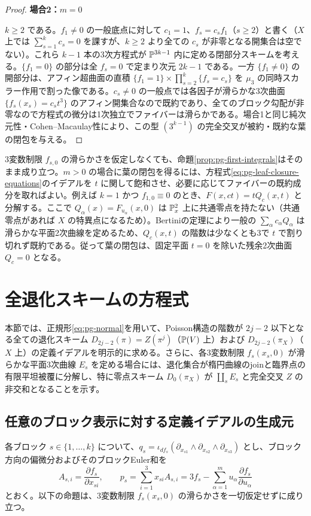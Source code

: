 \begin{proof}
\par\medskip\noindent\textbf{場合2：$m=0$}\par\nobreak\smallskip
$k\ge2$ である。$f_1\ne0$ の一般底点に対して $c_1=1$、$f_s=c_s f_1$（$s\ge2$）と書く（$X$ 上では $\sum_{s=1}^k c_s=0$ を課すが、$k\ge2$ より全ての $c_s$ が非零となる開集合は空でない）。これら $k-1$ 本の3次方程式が $\mathbb P^{3k-1}$ 内に定める閉部分スキームを考える。$\{f_1=0\}$ の部分は全 $f_s=0$ で定まり次元 $2k-1$ である。一方 $\{f_1\ne0\}$ の開部分は、アフィン超曲面の直積 $\{f_1=1\}\times\prod_{s=2}^k\{f_s=c_s\}$ を $\mu_3$ の同時スカラー作用で割った像である。$c_s\ne0$ の一般点では各因子が滑らかな3次曲面 $\{f_s(x_s)=c_s t^3\}$ のアフィン開集合なので既約であり、全てのブロック勾配が非零なので方程式の微分は1次独立でファイバーは滑らかである。場合1と同じ純次元性・Cohen--Macaulay性により、この型 $(3^{k-1})$ の完全交叉が被約・既約な葉の閉包を与える。
\end{proof}

\begin{remark}\label{rem:pg-zero-restriction-leaf}
3変数制限 $f_{s,0}$ の滑らかさを仮定しなくても、命題\ref{prop:pg-first-integrals}はそのまま成り立つ。$m>0$ の場合に葉の閉包を得るには、方程式\eqref{eq:pg-leaf-closure-equations}のイデアルを $t$ に関して飽和させ、必要に応じてファイバーの既約成分を取ればよい。例えば $k=1$ かつ $f_{1,0}\equiv0$ のとき、$F(x,ct)=tQ_c(x,t)$ と分解する。ここで $Q_\alpha(x)=F_{u_\alpha}(x,0)$ は $\mathbb P_x^2$ 上に共通零点を持たない（共通零点があれば $X$ の特異点になるため）。Bertiniの定理により一般の $\sum_\alpha c_\alpha Q_\alpha$ は滑らかな平面2次曲線を定めるため、$Q_c(x,t)$ の階数は少なくとも3で $t$ で割り切れず既約である。従って葉の閉包は、固定平面 $t=0$ を除いた残余2次曲面 $Q_c=0$ となる。
\end{remark}


\section{全退化スキームの方程式}\label{sec:pg-degeneracy}

本節では、正規形\eqref{eq:pg-normal}を用いて、Poisson構造の階数が $2j-2$ 以下となる全ての退化スキーム $D_{2j-2}(\pi)=Z(\pi^j)$（$\mathbb P(V)$ 上）および $D_{2j-2}(\pi_X)$（$X$ 上）の定義イデアルを明示的に求める。さらに、各3変数制限 $f_s(x_s,0)$ が滑らかな平面3次曲線 $E_s$ を定める場合には、退化集合が楕円曲線のjoinと臨界点の有限平坦被覆に分解し、特に零点スキーム $D_0(\pi_X)$ が $\coprod_s E_s$ と完全交叉 $Z$ の非交和となることを示す。

\subsection{任意のブロック表示に対する定義イデアルの生成元}
各ブロック $s\in\{1,\ldots,k\}$ について、$q_s=\iota_{df_s}(\partial_{x_{s1}}\wedge\partial_{x_{s2}}\wedge\partial_{x_{s3}})$ とし、ブロック方向の偏微分およびそのブロックEuler和を
\begin{equation}
A_{s,i}=\frac{\partial f_s}{\partial x_{si}},\qquad
p_s=\sum_{i=1}^3 x_{si}A_{s,i}=3f_s-\sum_{\alpha=1}^m u_\alpha\frac{\partial f_s}{\partial u_\alpha}
\end{equation}
とおく。以下の命題は、3変数制限 $f_s(x_s,0)$ の滑らかさを一切仮定せずに成り立つ。

